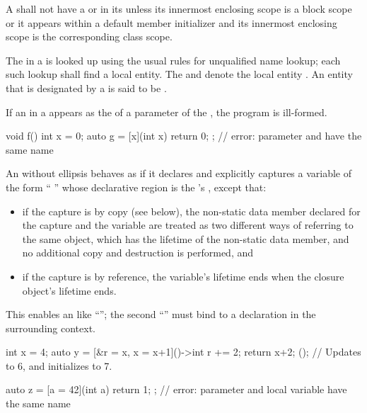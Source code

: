 \pnum
A  shall not have
a  or 
in its 
unless its innermost enclosing scope is a block scope
or it appears within a default member initializer
and its innermost enclosing scope is
the corresponding class scope.

\pnum
The  in a  is looked up using the
usual rules for unqualified name lookup; each such lookup
shall find a local entity.
The   and 
denote the local entity .
An entity that is designated by a
is said to be .

\pnum
If an  in a  appears
as the  of a parameter of
the  ,
the program is ill-formed.
\begin{example}
\begin{codeblock}
void f() {
  int x = 0;
  auto g = [x](int x) { return 0; };    // error: parameter and  have the same name
}
\end{codeblock}
\end{example}

\pnum
An  without ellipsis
behaves as if it declares and explicitly captures a
variable of
the form ``  \tcode{;}''
whose declarative region is the 's
, except that:
\begin{itemize}
\item if the capture is by copy (see below), the non-static data member
declared for the capture and the variable are treated as two different ways
of referring to the same object, which has the lifetime of the non-static
data member, and no additional copy and destruction is performed, and
\item if the capture is by reference, the variable's lifetime ends when the
closure object's lifetime ends.
\end{itemize}
\begin{note}
This enables an  like
``''; the second ``'' must bind to a
declaration in the surrounding context.
\end{note}
\begin{example}
\begin{codeblock}
int x = 4;
auto y = [&r = x, x = x+1]()->int {
            r += 2;
            return x+2;
         }();                               // Updates  to 6, and initializes  to 7.

auto z = [a = 42](int a) { return 1; };     // error: parameter and local variable have the same name
\end{codeblock}
\end{example}

